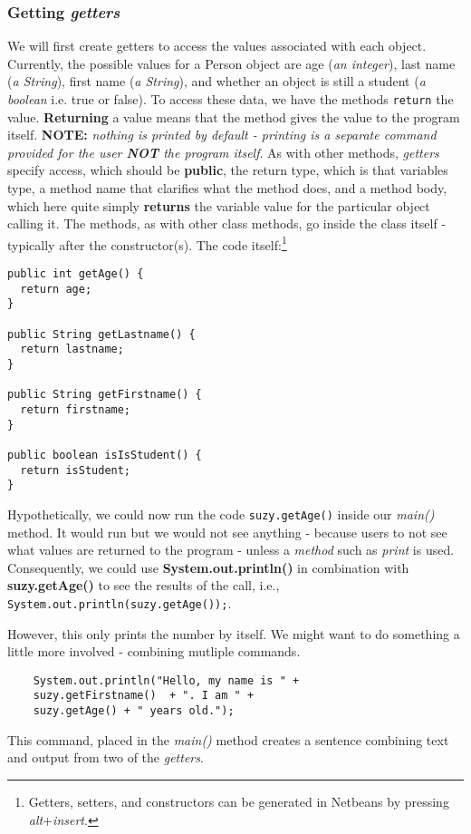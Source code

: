 \documentclass{article}
\begin{document}
\begin{flushleft}
\subsubsection{Getting \emph{getters}}
We will first create getters to access the values associated with each object. Currently, the possible values for a Person object are age (\emph{an integer}), last name (\emph{a String}), first name (\emph{a String}), and whether an object is still a student (\emph{a boolean} i.e. true or false). To access these data, we have the methods \texttt{return} the value. \textbf{Returning} a value means that the method gives the value to the program itself. \textbf{NOTE:} \emph{nothing is printed by default - printing is a separate command provided for the user \textbf{NOT} the program itself}.  
As with other methods, \emph{getters} specify access, which should be \textbf{public}, the return type, which is that variables type, a method name that clarifies what the method does, and a method body, which here quite simply \textbf{returns} the variable value for the particular object calling it. The methods, as with other class methods, go inside the class itself - typically after the constructor(s). The code itself:\footnote{Getters, setters, and constructors can be generated in Netbeans by pressing \emph{alt}+\emph{insert}.}\par

\label{code:gettersperson}
\begin{verbatim}
public int getAge() {
  return age;
}

public String getLastname() {
  return lastname;
}

public String getFirstname() {
  return firstname;
}

public boolean isIsStudent() {
  return isStudent;
}
\end{verbatim}

Hypothetically, we could now run the code \texttt{suzy.getAge()} inside our \emph{main()} method. It would run but we would not see anything - because users to not see what values are returned to the program - unless a \emph{method} such as \emph{print} is used. Consequently, we could use \textbf{System.out.println()} in combination with \textbf{suzy.getAge()} to see the results of the call, i.e., \texttt{System.out.println(suzy.getAge());}.\par
However, this only prints the number by itself. We might want to do something a little more involved - combining mutliple commands.
\begin{tcolorbox}[enhanced,breakable, before upper={\let\clearpage\relax}, width=4in,center upper,
    fontupper=\bfseries,drop fuzzy shadow southeast,
    boxrule=0.4pt,sharp corners,colframe=gray!80!black,colback=gray!10]
  \begin{verbatim}
    System.out.println("Hello, my name is " +
    suzy.getFirstname()  + ". I am " +
    suzy.getAge() + " years old.");    
  \end{verbatim}
\end{tcolorbox}
\noindent This command, placed in the \emph{main()} method creates a sentence combining text and output from two of the \emph{getters}.

\end{flushleft}
\end{document}
